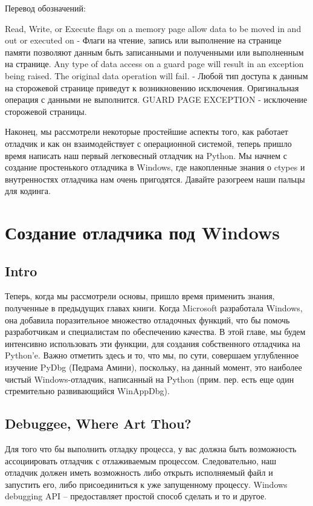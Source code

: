 \documentclass[12pt]{book}
\begin{document}
Перевод обозначений:

    Read, Write, or Execute flags on a memory page allow data to be moved in and out or executed on - Флаги на чтение, запись или выполнение на странице памяти позволяют данным быть записанными и полученными или выполненным на странице.
    Any type of data access on a guard page will result in an exception being raised. The original data operation will fail. - Любой тип доступа к данным на сторожевой странице приведут к возникновению исключения. Оригинальная операция с данными не выполнится.
    GUARD PAGE EXCEPTION - исключение сторожевой страницы.

Наконец, мы рассмотрели некоторые простейшие аспекты того, как работает отладчик и как он взаимодействует с операционной системой, теперь пришло время написать наш первый легковесный отладчик на Python. Мы начнем с создание простенького отладчика в Windows, где накопленные знания о ctypes и внутренностях отладчика нам очень пригодятся. Давайте разогреем наши пальцы для кодинга.

\chapter{Создание отладчика под Windows}
\section*{Intro}

Теперь, когда мы рассмотрели основы, пришло время применить знания, полученные в предыдущих главах книги. Когда Microsoft разработала Windows, она добавила поразительное множество отладочных функций, что бы помочь разработчикам и специалистам по обеспечению качества. В этой главе, мы будем интенсивно использовать эти функции, для создания собственного отладчика на Python’e. Важно отметить здесь и то, что мы, по сути, совершаем углубленное изучение PyDbg (Педрама Амини), поскольку, на данный момент, это наиболее чистый Windows-отладчик, написанный на Python (прим. пер. есть еще один стремительно развивающийся WinAppDbg). 


\section{Debuggee, Where Art Thou?}

Для того что бы выполнить отладку процесса, у вас должна быть возможность ассоциировать отладчик с отлаживаемым процессом. Следовательно, наш отладчик должен иметь возможность либо открыть исполняемый файл и запустить его, либо присоединиться к уже запущенному процессу. Windows debugging API – предоставляет простой способ сделать и то и другое.
\end{document}
